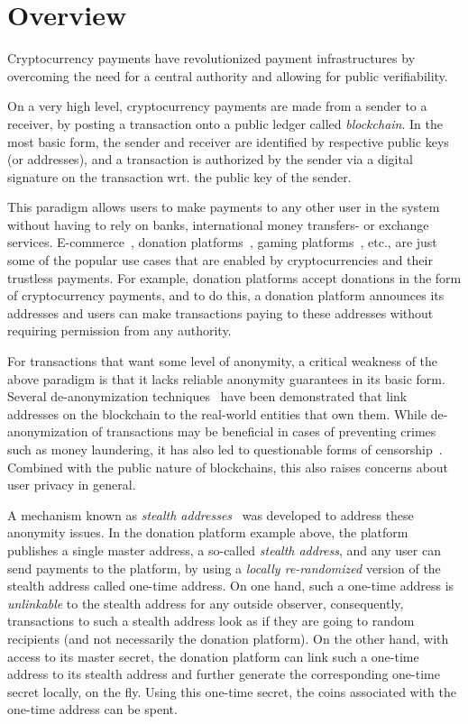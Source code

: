 \section{Overview}

Cryptocurrency payments have revolutionized payment infrastructures by overcoming the need for a central authority and allowing for public verifiability.

On a very high level, cryptocurrency payments are made from a sender to a receiver, by posting a transaction onto a public ledger called \emph{blockchain}.
In the most basic form, the sender and receiver are identified by respective public keys (or addresses), and a transaction is authorized by the sender via a digital signature on the transaction wrt. the public key of the sender.

This paradigm allows users to make payments to any other user in the system without having to rely on banks, international money transfers- or exchange services.
E-commerce~\cite{ecommerce}, donation platforms~\cite{donation1,donation2,donation3}, gaming platforms~\cite{egaming}, etc., are just some of the  popular use cases that are enabled by cryptocurrencies and their trustless payments. 
For example, donation platforms accept donations in the form of cryptocurrency payments, and to do this, a donation platform announces its addresses and users can make transactions paying to these addresses without requiring permission from any authority.

For transactions that want some level of anonymity, a critical weakness of the above paradigm is that it lacks reliable anonymity guarantees in its basic form. Several de-anonymization techniques~\cite{receiver1,receiver2,receiver3,receiver4,moser2017empirical} have been demonstrated that link addresses on the blockchain to the real-world entities that own them.
While de-anonymization of transactions may be beneficial in cases of preventing crimes such as money laundering, it has also led to questionable forms of censorship~\cite{freedom-convoy}. Combined with the public nature of blockchains, this also raises concerns about user privacy in general. 

A mechanism known as \emph{stealth addresses}~\cite{stealth1,stealth2,stealth3,courtois2017stealth} was developed to address these anonymity issues. In the donation platform example above, the platform publishes a single master address, a so-called \emph{stealth address}, and any user can send payments to the platform, by using a \emph{locally re-randomized} version of the stealth address called one-time address. On one hand, such a one-time address is \emph{unlinkable} to the stealth address for any outside observer, consequently, transactions to such a stealth address look as if they are going to random recipients (and not necessarily the donation platform). On the other hand, with access to its master secret, the donation platform can link such a one-time address to its stealth address and further generate the corresponding one-time secret locally, on the fly. Using this one-time secret, the coins associated with the one-time address can be spent.


